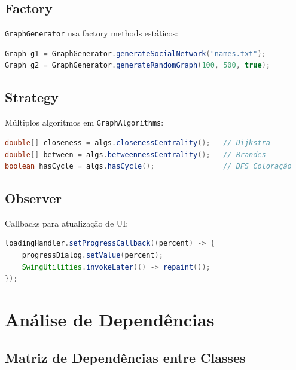 \documentclass[12pt,a4paper]{article}
\begin{document}
\subsection{Factory}

\texttt{GraphGenerator} usa factory methods estáticos:

\begin{lstlisting}[language=Java, caption=Factory Pattern]
Graph g1 = GraphGenerator.generateSocialNetwork("names.txt");
Graph g2 = GraphGenerator.generateRandomGraph(100, 500, true);
\end{lstlisting}

\subsection{Strategy}

Múltiplos algoritmos em \texttt{GraphAlgorithms}:

\begin{lstlisting}[language=Java, caption=Strategy Pattern]
double[] closeness = algs.closenessCentrality();   // Dijkstra
double[] between = algs.betweennessCentrality();   // Brandes
boolean hasCycle = algs.hasCycle();                // DFS Coloração
\end{lstlisting}

\subsection{Observer}

Callbacks para atualização de UI:

\begin{lstlisting}[language=Java, caption=Observer Pattern]
loadingHandler.setProgressCallback((percent) -> {
    progressDialog.setValue(percent);
    SwingUtilities.invokeLater(() -> repaint());
});
\end{lstlisting}

\newpage

\section{Análise de Dependências}

\subsection{Matriz de Dependências entre Classes}
\end{document}
